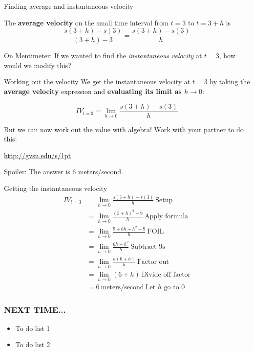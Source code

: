 \documentclass{beamer}
\begin{document}
    \begin{frame}{Finding average and instantaneous velocity}
    
    The \textbf{average velocity} on the small time interval from $t=3$ to $t=3+h$ is
    \begin{equation*}
        \frac{s(3+h)-s(3)}{(3+h)-3} = \frac{s(3+h) - s(3)}{h}
    \end{equation*}
    
    On Mentimeter: If we wanted to find the \textit{instantaneous velocity} at $t=3$, how would we modify this? 
        
    \end{frame}
    
    \begin{frame}{Working out the velocity}
        We get the instantaneous velocity at $t=3$ by taking the \textbf{average velocity} expression and \textbf{evaluating its limit as $h \to 0$}: 
        
        \begin{equation*}
            IV_{t=3} = \lim_{h \to 0} \frac{s(3+h) - s(3)}{h}
        \end{equation*}
        
    But we can now work out the value with algebra! Work with your partner to do this: 
        \begin{center}
            \url{http://gvsu.edu/s/1pt}
        \end{center}
    
    Spoiler: The answer is 6 meters/second. 
    \end{frame}
    
    \begin{frame}{Getting the instantaneous velocity}
    \begin{align*}
        IV_{t=3} &= \lim_{h \to 0} \frac{s(3+h) - s(3)}{h} \ \text{Setup} \\
        &= \lim_{h \to 0} \frac{(3+h)^2 - 9}{h}  \ \text{Apply formula} \\
        &= \lim_{h \to 0} \frac{9 + 6h + h^2 - 9}{h}  \ \text{FOIL} \\
        &= \lim_{h \to 0} \frac{6h + h^2}{h}  \ \text{Subtract 9s} \\
        &= \lim_{h \to 0} \frac{h(6 + h)}{h}  \ \text{Factor out} \\
        &= \lim_{h \to 0} (6+h)  \ \text{Divide off factor} \\
        &= 6 \ \text{meters/second}  \ \text{Let $h$ go to $0$}
    \end{align*}
    
    \end{frame}


\begin{frame}
    \frametitle{NEXT TIME...}

    \begin{itemize}
        \item To do list 1
        \item To do list 2
    \end{itemize}

\end{frame}
\end{document}
